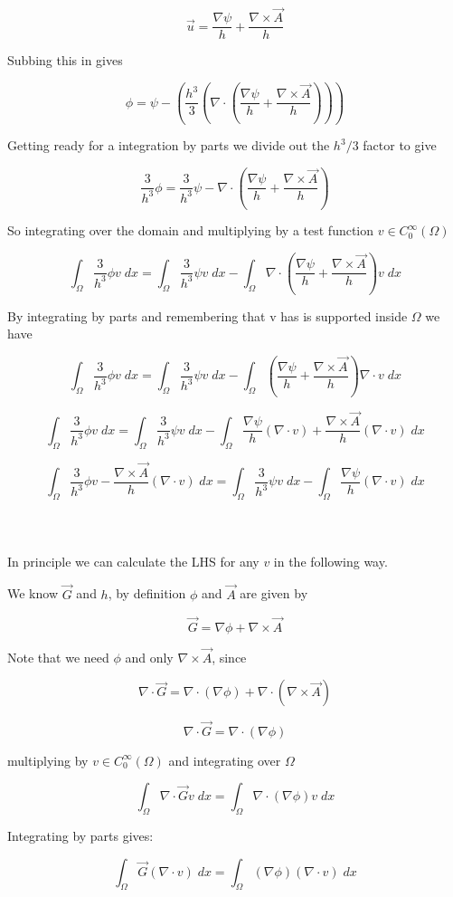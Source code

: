 \documentclass[12pt]{article}
\begin{document}
\[\vec{u} = \frac{\nabla \psi }{h} + \frac{\nabla \times \vec{A} }{h}\]

Subbing this in gives

\[ \phi = \psi - \left(\frac{h^3}{3} \left(\nabla \cdot \left(\frac{\nabla \psi }{h} + \frac{\nabla \times \vec{A} }{h}\right)\right)\right)\]

Getting ready for a integration by parts we divide out the $h^3/3$ factor to give

\[ \frac{3}{h^3}\phi = \frac{3}{h^3}\psi - \nabla \cdot \left(\frac{\nabla \psi }{h} + \frac{\nabla \times \vec{A} }{h}\right)\]

So integrating over the domain and multiplying by a test function $v \in C^{\infty}_0 (\Omega)$

\[ \int_{\Omega} \frac{3}{h^3}\phi v \; dx = \int_{\Omega} \frac{3}{h^3}\psi v \; dx - \int_{\Omega}\nabla \cdot \left(\frac{\nabla \psi }{h} + \frac{\nabla \times \vec{A} }{h}\right) v \; dx\]

By integrating by parts and remembering that v has is supported inside $\Omega$ we have

\[ \int_{\Omega} \frac{3}{h^3}\phi v \; dx = \int_{\Omega} \frac{3}{h^3}\psi v \; dx - \int_{\Omega}\left(\frac{\nabla \psi }{h} + \frac{\nabla \times \vec{A} }{h}\right) \nabla \cdot v \; dx\]

\[ \int_{\Omega} \frac{3}{h^3}\phi v \; dx = \int_{\Omega} \frac{3}{h^3}\psi v \; dx - \int_{\Omega} \frac{\nabla \psi }{h}\left(\nabla \cdot v\right) + \frac{\nabla \times \vec{A} }{h}\left(\nabla \cdot v\right) \; dx\]

\[ \int_{\Omega} \frac{3}{h^3}\phi v - \frac{\nabla \times \vec{A} }{h}\left(\nabla \cdot v\right)  \; dx = \int_{\Omega} \frac{3}{h^3}\psi v \; dx - \int_{\Omega} \frac{\nabla \psi }{h}\left(\nabla \cdot v\right)  \; dx\] \\ \\ \\






In principle we can calculate the LHS for any $v$ in the following way. 

We know $\vec{G}$ and $h$, by definition $\phi$ and $\vec{A}$ are given by

\[\vec{G} = \nabla \phi + \nabla \times \vec{A}\] 

Note that we need $\phi$ and only $\nabla \times \vec{A}$, since

\[\nabla \cdot \vec{G} =  \nabla \cdot (\nabla \phi) +  \nabla \cdot(\nabla \times \vec{A})\] 

\[\nabla \cdot \vec{G} =  \nabla \cdot (\nabla \phi)\] 

multiplying by $v \in C^\infty_0(\Omega)$ and integrating over $\Omega$

\[\int_{\Omega}\nabla \cdot \vec{G} v \; dx =  \int_{\Omega}\nabla \cdot (\nabla \phi) v \; dx\] 

Integrating by parts gives:

\[\int_{\Omega}\vec{G}  (\nabla \cdot v) \; dx =  \int_{\Omega}(\nabla \phi)  (\nabla \cdot v) \; dx\]

 
\end{document}

